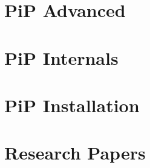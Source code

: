\documentclass[a4paper,11pt,makeidx]{report} %
\begin{document}
\chapter{PiP Advanced}\label{chap:advanced}










\chapter{PiP Internals}



\chapter{PiP Installation}



\chapter{Research Papers}

\appendix
\comment{
  
}

\printindex
\end{document}
